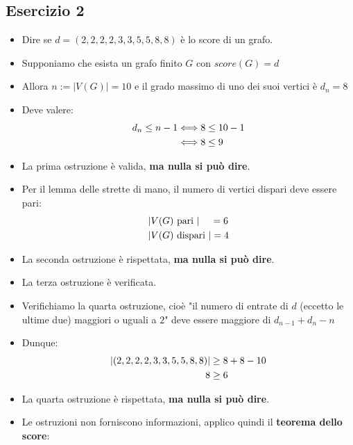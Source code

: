 \documentclass[10pt]{article}
\begin{document}
	\subsection{Esercizio 2}
	\begin{itemize}
	\item
	Dire se $d = (2,2,2,2,3,3,5,5,8,8)$ è lo score di un grafo.
	\item
	Supponiamo che esista un grafo finito $G$ con $score(G) = d$
	\item
	Allora $n := |V(G)| = 10$ e il grado massimo di uno dei suoi vertici è $d_n = 8$
	\item
	Deve valere:
	\begin{equation}
	\begin{split}
		d_n \leq n - 1 &\Longleftrightarrow 8 \leq 10 - 1  \\
		&\Longleftrightarrow 8 \leq 9
		\notag
		\end{split}
	\end{equation}
	\item
	La prima ostruzione è valida, \textbf{ma nulla si può dire}.
	\item
	Per il lemma delle strette di mano, il numero di vertici dispari deve essere pari:
	\begin{equation}
	\begin{split}
		|&V(G) \textrm{ pari }| \quad\, =  6\\
		|&V(G) \textrm{ dispari }| = 4 
		\notag
		\end{split}
	\end{equation}
	\item
	La seconda ostruzione è rispettata, \textbf{ma nulla si può dire}.
	\item
	La terza ostruzione è verificata.
	\item
	Verifichiamo la quarta ostruzione, cioè "il numero di entrate di $d$ (eccetto le ultime due) maggiori o uguali a $2$" deve essere maggiore di $d_{n-1} + d_n - n$
	\item
	Dunque:
	\begin{equation}
	\begin{split}
		|(2,2,2,2,3,3,5,5,8,8)| &\geq 8+8-10 \\
		8 &\geq 6
		\notag
		\end{split}
	\end{equation}
	\item
	La quarta ostruzione è rispettata, \textbf{ma nulla si può dire}.
	\item
	Le ostruzioni non forniscono informazioni, applico quindi il \textbf{teorema dello score}:

\end{itemize}
\end{document}
